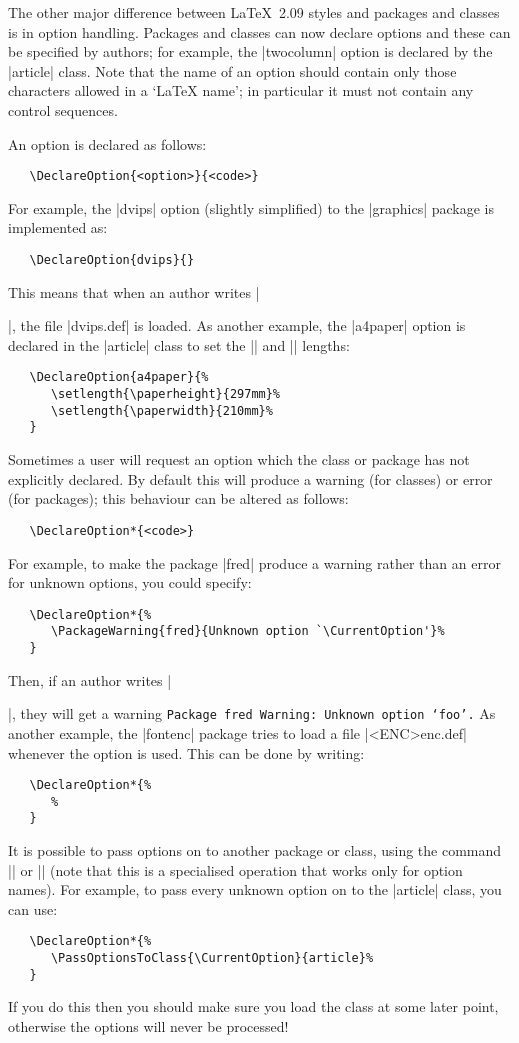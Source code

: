 \documentclass{ltxguide}[1995/11/28]
\begin{document}
The other major difference between \LaTeX~2.09 styles and \LaTeXe{}
packages and classes is in option handling.  Packages and classes can
now declare options and these can be specified by authors; for
example, the |twocolumn| option is declared by the |article| class.
Note that the name of an option should contain only those characters
allowed in a `\LaTeX{} name'; in particular it must not contain any
control sequences.

An option is declared as follows:
\begin{verbatim}
   \DeclareOption{<option>}{<code>}
\end{verbatim}
For example, the |dvips| option (slightly simplified)
to the |graphics| package is implemented as:
\begin{verbatim}
   \DeclareOption{dvips}{}
\end{verbatim}
This means that when an author writes |\usepackage[dvips]{graphics}|,
the file |dvips.def| is loaded.  As another example, the |a4paper|
option is declared in the |article| class to set the |\paperheight|
and |\paperwidth| lengths:
\begin{verbatim}
   \DeclareOption{a4paper}{%
      \setlength{\paperheight}{297mm}%
      \setlength{\paperwidth}{210mm}%
   }
\end{verbatim}
Sometimes a user will request an option which the class
or package has not explicitly declared.  By default this will produce
a warning (for classes) or error (for packages); this behaviour
can be altered as follows:
\begin{verbatim}
   \DeclareOption*{<code>}
\end{verbatim}
For example, to make the package |fred| produce a warning rather than
an error for unknown options, you could specify:
\begin{verbatim}
   \DeclareOption*{%
      \PackageWarning{fred}{Unknown option `\CurrentOption'}%
   }
\end{verbatim}
Then, if an author writes |\usepackage[foo]{fred}|, they will get a
warning \texttt{Package fred Warning: Unknown option `foo'.}  As
another example, the |fontenc| package tries to load a file
|<ENC>enc.def| whenever the  option is used.  This
can be done by writing:
\begin{verbatim}
   \DeclareOption*{%
      %
   }
\end{verbatim}
It is possible to pass options on to another package or class, using
the command |\PassOptionsToPackage| or |\PassOptionsToClass| (note
that this is a specialised operation that works only for option
names).  For example, to pass every unknown option on to the |article|
class, you can use:
\begin{verbatim}
   \DeclareOption*{%
      \PassOptionsToClass{\CurrentOption}{article}%
   }
\end{verbatim}
If you do this then you should make sure you load the class at some
later point, otherwise the options will never be processed!
\end{document}
